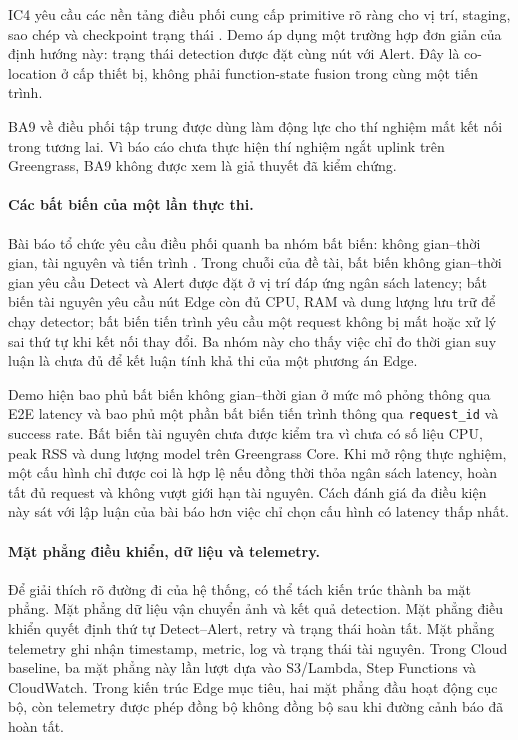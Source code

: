 IC4 yêu cầu các nền tảng điều phối cung cấp primitive rõ ràng cho vị trí, staging,
sao chép và checkpoint trạng thái \cite{malazi2026orchestrating}. Demo áp dụng một
trường hợp đơn giản của định hướng này: trạng thái detection được đặt cùng nút với
Alert. Đây là co-location ở cấp thiết bị, không phải function-state fusion trong
cùng một tiến trình.

BA9 về điều phối tập trung được dùng làm động lực cho thí nghiệm mất kết nối trong
tương lai. Vì báo cáo chưa thực hiện thí nghiệm ngắt uplink trên Greengrass, BA9
không được xem là giả thuyết đã kiểm chứng.

\paragraph{Các bất biến của một lần thực thi.}

Bài báo tổ chức yêu cầu điều phối quanh ba nhóm bất biến: không gian--thời gian,
tài nguyên và tiến trình \cite{malazi2026orchestrating}. Trong chuỗi của đề tài,
bất biến không gian--thời gian yêu cầu Detect và Alert được đặt ở vị trí đáp ứng
ngân sách latency; bất biến tài nguyên yêu cầu nút Edge còn đủ CPU, RAM và dung
lượng lưu trữ để chạy detector; bất biến tiến trình yêu cầu một request không bị
mất hoặc xử lý sai thứ tự khi kết nối thay đổi. Ba nhóm này cho thấy việc chỉ đo
thời gian suy luận là chưa đủ để kết luận tính khả thi của một phương án Edge.

Demo hiện bao phủ bất biến không gian--thời gian ở mức mô phỏng thông qua E2E
latency và bao phủ một phần bất biến tiến trình thông qua \texttt{request\_id} và
success rate. Bất biến tài nguyên chưa được kiểm tra vì chưa có số liệu CPU, peak
RSS và dung lượng model trên Greengrass Core. Khi mở rộng thực nghiệm, một cấu hình
chỉ được coi là hợp lệ nếu đồng thời thỏa ngân sách latency, hoàn tất đủ request và
không vượt giới hạn tài nguyên. Cách đánh giá đa điều kiện này sát với lập luận của
bài báo hơn việc chỉ chọn cấu hình có latency thấp nhất.

\paragraph{Mặt phẳng điều khiển, dữ liệu và telemetry.}

Để giải thích rõ đường đi của hệ thống, có thể tách kiến trúc thành ba mặt phẳng.
Mặt phẳng dữ liệu vận chuyển ảnh và kết quả detection. Mặt phẳng điều khiển quyết
định thứ tự Detect--Alert, retry và trạng thái hoàn tất. Mặt phẳng telemetry ghi
nhận timestamp, metric, log và trạng thái tài nguyên. Trong Cloud baseline, ba mặt
phẳng này lần lượt dựa vào S3/Lambda, Step Functions và CloudWatch. Trong kiến trúc
Edge mục tiêu, hai mặt phẳng đầu hoạt động cục bộ, còn telemetry được phép đồng bộ
không đồng bộ sau khi đường cảnh báo đã hoàn tất.

